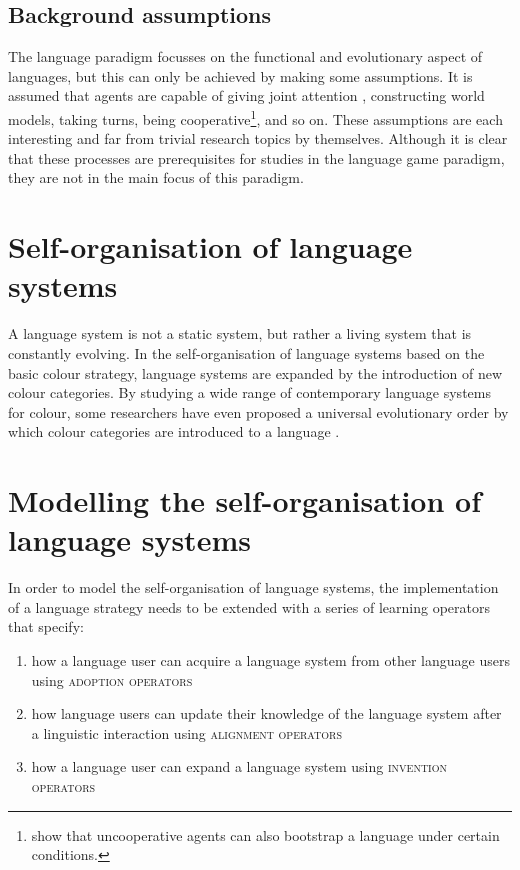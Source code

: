 \subsection{Background assumptions}

The language paradigm focusses on the functional and evolutionary
aspect of languages, but this can only be achieved by making some
assumptions. It is assumed that agents are capable of giving joint
attention \citep{tomasello95jointattention}, constructing world
models, taking turns, being cooperative\footnote{\cite{wang08self}
  show that uncooperative agents can also bootstrap a language under
  certain conditions.}, and so on. These assumptions are each
interesting and far from trivial research topics by
themselves. Although it is clear that these processes are
prerequisites for studies in the language game paradigm, they are not
in the main focus of this paradigm.

\section{Self-organisation of language systems}

A language system is not a static system, but rather a living system
that is constantly evolving. In the self-organisation of language systems
based on the basic colour strategy, language systems are expanded by
the introduction of new colour categories. By studying a wide range of
contemporary language systems for colour, some researchers have even
proposed a universal evolutionary order by which colour categories are
introduced to a language \citep{berlin69basic}.


\section{Modelling the self-organisation of language systems}

In order to model the self-organisation of language systems, 
the implementation of a language strategy needs\enlargethispage{\baselineskip}
to be extended with a series of learning operators that specify:

\begin{enumerate}
\item how a language user can acquire a language system from other
  language users using \textsc{adoption operators}
\item how language users can update their knowledge of the language
  system after a linguistic interaction using \textsc{alignment
    operators}
\item how a language user can expand a language system using
  \textsc{invention operators}
\end{enumerate}

